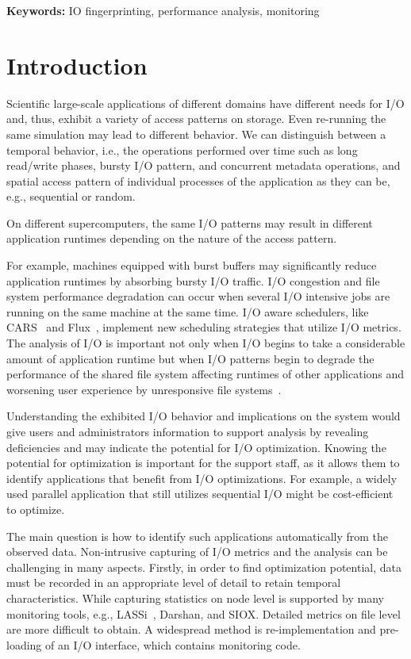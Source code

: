 \documentclass{jhps}
\begin{document}
\textbf{Keywords: }IO fingerprinting, performance analysis, monitoring

\section{Introduction}
Scientific large-scale applications of different domains have different needs for I/O and, thus, exhibit a variety of access patterns on storage.
Even re-running the same simulation may lead to different behavior.
We can distinguish between a temporal behavior, i.e., the operations performed over time such as long read/write phases, bursty I/O pattern, and concurrent metadata operations, and spatial access pattern of individual processes of the application as they can be, e.g., sequential or random.

On different supercomputers, the same I/O patterns may result in different application runtimes depending on the nature of the access pattern.

For example, machines equipped with burst buffers \cite{10.1007/978-3-030-02465-9_9, 7004215} may significantly reduce application runtimes by absorbing bursty I/O traffic.
I/O congestion and file system performance degradation can occur when several I/O intensive jobs are running on the same machine at the same time.
I/O aware schedulers, like CARS~\cite{LIANG201925} and Flux~\cite{flux}, implement new scheduling strategies that utilize I/O metrics.
The analysis of I/O is important not only when I/O begins to take a considerable amount of application runtime but when I/O patterns begin to degrade the performance of the shared file system affecting runtimes of other applications and worsening user experience by unresponsive file systems~\cite{10.1007/978-3-030-02465-9_5}.

Understanding the exhibited I/O behavior and implications on the system would give users and administrators information to support analysis by revealing deficiencies and may indicate the potential for I/O optimization.
Knowing the potential for optimization is important for the support staff, as it allows them to identify applications that benefit from I/O optimizations.
For example, a widely used parallel application that still utilizes sequential I/O might be cost-efficient to optimize.

The main question is how to identify such applications automatically from the observed data.
Non-intrusive capturing of I/O metrics and the analysis can be challenging in many aspects.
Firstly, in order to find optimization potential, data must be recorded in an appropriate level of detail to retain temporal characteristics.
While capturing statistics on node level is supported by many monitoring tools, e.g., LASSi~\cite{sivalingam2019lassi}, Darshan\cite{hpcdarshan}, and SIOX\cite{TSACAMAOOP14}.
Detailed metrics on file level are more difficult to obtain.
A widespread method is re-implementation and pre-loading of an I/O interface, which contains monitoring code.
\end{document}
